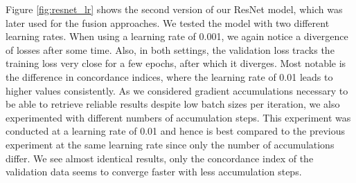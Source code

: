 Figure \ref{fig:resnet_lr} shows the second version of our ResNet model, which was later used for the fusion approaches. We tested the model with two different learning rates. When using a learning rate of 0.001, we again notice a divergence of losses after some time. Also, in both settings, the validation loss tracks the training loss very close for a few epochs, after which it diverges. Most notable is the difference in concordance indices, where the learning rate of 0.01 leads to higher values consistently. 
As we considered gradient accumulations necessary to be able to retrieve reliable results despite low batch sizes per iteration, we also experimented with different numbers of accumulation steps. This experiment was conducted at a learning rate of 0.01 and hence is best compared to the previous experiment at the same learning rate since only the number of accumulations differ. We see almost identical results, only the concordance index of the validation data seems to converge faster with less accumulation steps.


